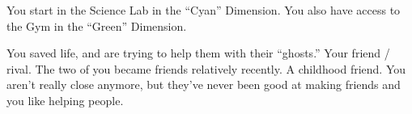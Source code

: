 \documentclass[char]{TMFHope}
\begin{document}
\begin{itemz}[Notes]
	\item You start in the Science Lab in the ``Cyan'' Dimension. You also have access to the Gym in the ``Green'' Dimension. 
\end{itemz}

\begin{contacts}
	\contact{\cCap{}} You saved \cCap{\their} life, and are trying to help them with their ``ghosts.''
	\contact{\cSci{}} Your friend / rival. The two of you became friends relatively recently.
	\contact{\cCDip{}} A childhood friend. You aren't really close anymore, but they've never been good at making friends and you like helping people.
\end{contacts}
\end{document}
